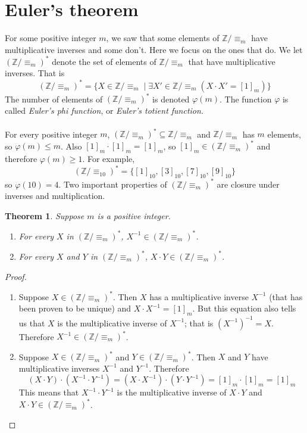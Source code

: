 \documentclass{report}
\newtheorem*{theorem}{Theorem}
\theoremstyle{definition}
\begin{document}
\section{Euler's theorem}
For some positive integer $m$,
we saw that some elements of $\mathbb Z/\equiv_m$ have multiplicative inverses and some don't.
Here we focus on the ones that do. We let $(\mathbb Z/\equiv_m)^*$ denote the set of elements 
of $\mathbb Z/\equiv_m$ that have multiplicative inverses. That is
\begin{equation*}
(\mathbb Z/\equiv_m)^*=\{X\in\mathbb Z/\equiv_m\mid\exists X'\in\mathbb Z/\equiv_m(X\cdot X'=[1]_m)\}
\end{equation*}
The number of elements of $(\mathbb Z/\equiv_m)^*$ is denoted $\varphi(m)$. The function $\varphi$ is called \textit{Euler's phi function}, or \textit{Euler's totient function}.\\
\vspace{1mm}\\
For every positive
integer $m$, $(\mathbb Z/\equiv_m)^*\subseteq\mathbb Z/\equiv_m$ and $\mathbb Z/\equiv_m$ has $m$
elements, so $\varphi(m)\leq m$. Also $[1]_m\cdot[1]_m=[1]_m$, so $[1]_m\in(\mathbb Z/\equiv_m)^*$ and therefore $\varphi(m)\geq1$.
For example,
\begin{equation*}
(\mathbb Z/\equiv_{10})^*=\{[1]_{10},[3]_{10},[7]_{10},[9]_{10}\}
\end{equation*}
so $\varphi(10)=4$. Two important properties of $(\mathbb Z/\equiv_m)^*$ are closure under inverses and multiplication.
\begin{theorem}
Suppose $m$ is a positive integer.
\begin{enumerate}
\item For every $X$ in $(\mathbb Z/\equiv_m)^*$, $X^{-1}\in(\mathbb Z/\equiv_m)^*$.
\item For every $X$ and $Y$ in $(\mathbb Z/\equiv_m)^*$, $X\cdot Y\in(\mathbb Z/\equiv_m)^*$.
\end{enumerate}
\end{theorem}
\begin{proof}\hspace{1mm}
\begin{enumerate}
\item Suppose $X\in(\mathbb Z/\equiv_m)^*$. Then $X$ has a multiplicative inverse $X^{-1}$ (that has been proven to be unique) and $X\cdot X^{-1}=[1]_m$. But this equation also tells us that 
$X$ is the multiplicative inverse of $X^{-1}$; that is $(X^{-1})^{-1}=X$. Therefore $X^{-1}\in(\mathbb Z/\equiv_m)^*$.
\item Suppose $X\in(\mathbb Z/\equiv_m)^*$ and $Y\in(\mathbb Z/\equiv_m)^*$. Then $X$ and $Y$ have multiplicative inverses $X^{-1}$ and $Y^{-1}$. Therefore
\begin{equation*}
(X\cdot Y)\cdot(X^{-1}\cdot Y^{-1})=(X\cdot X^{-1})\cdot(Y\cdot Y^{-1})=[1]_m\cdot[1]_m=[1]_m
\end{equation*}
This means that $X^{-1}\cdot Y^{-1}$ is the multiplicative inverse of $X\cdot Y$ and $X\cdot Y\in(\mathbb Z/\equiv_m)^*$.\qedhere
\end{enumerate}
\end{proof}
\end{document}

